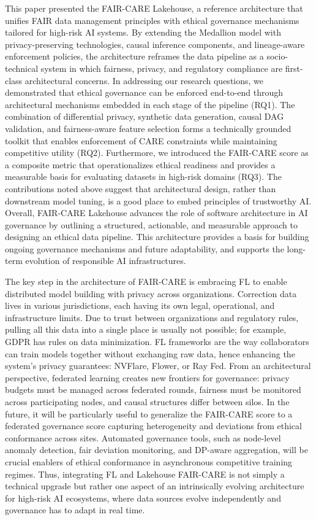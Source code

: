 This paper presented the FAIR-CARE Lakehouse, a reference architecture that unifies FAIR data management principles with ethical governance mechanisms tailored for high-risk AI systems. By extending the Medallion model with privacy-preserving technologies, causal inference components, and lineage-aware enforcement policies, the architecture reframes the data pipeline as a socio-technical system in which fairness, privacy, and regulatory compliance are first-class architectural concerns. In addressing our research questions, we demonstrated that ethical governance can be enforced end-to-end through architectural mechanisms embedded in each stage of the pipeline (RQ1). The combination of differential privacy, synthetic data generation, causal DAG validation, and fairness-aware feature selection forms a technically grounded toolkit that enables enforcement of CARE constraints while maintaining competitive utility (RQ2). Furthermore, we introduced the FAIR-CARE score as a composite metric that operationalizes ethical readiness and provides a measurable basis for evaluating datasets in high-risk domains (RQ3). The contributions noted above suggest that architectural design, rather than downstream model tuning, is a good place to embed principles of trustworthy AI. Overall, FAIR-CARE Lakehouse advances the role of software architecture in AI governance by outlining a structured, actionable, and measurable approach to designing an ethical data pipeline. This architecture provides a basis for building ongoing governance mechanisms and future adaptability, and supports the long-term evolution of responsible AI infrastructures.


The key step in the architecture of FAIR-CARE is embracing FL to enable distributed model building with privacy across organizations. Correction data lives in various jurisdictions, each having its own legal, operational, and infrastructure limits. Due to trust between organizations and regulatory rules, pulling all this data into a single place is usually not possible; for example, GDPR has rules on data minimization. FL frameworks are the way collaborators can train models together without exchanging raw data, hence enhancing the system's privacy guarantees: NVFlare, Flower, or Ray Fed. From an architectural perspective, federated learning creates new frontiers for governance: privacy budgets must be managed across federated rounds, fairness must be monitored across participating nodes, and causal structures differ between silos. In the future, it will be particularly useful to generalize the FAIR-CARE score to a federated governance score capturing heterogeneity and deviations from ethical conformance across sites. Automated governance tools, such as node-level anomaly detection, fair deviation monitoring, and DP-aware aggregation, will be crucial enablers of ethical conformance in asynchronous competitive training regimes. Thus, integrating FL and Lakehouse FAIR-CARE is not simply a technical upgrade but rather one aspect of an intrinsically evolving architecture for high-risk AI ecosystems, where data sources evolve independently and governance has to adapt in real time.
